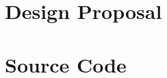 \documentclass[11pt]{mvlthesis}
\begin{document}





%



%
\appendix 


\chapter{Design Proposal}
\label{ch:proposal}





\chapter{Source Code}
\label{ch:code}


\end{document}
